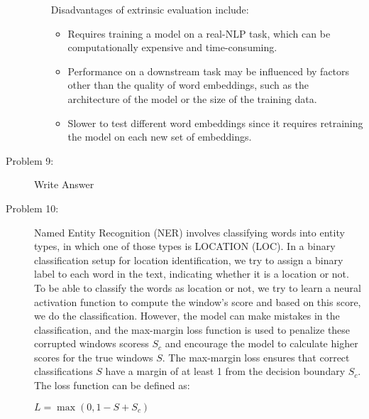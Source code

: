 \documentclass[12pt]{article}
\begin{document}
\begin{description}
\begin{enumerate}
  Disadvantages of extrinsic evaluation include:

  \begin{itemize}
    \item Requires training a model on a real-NLP task, which can be computationally expensive and time-consuming.
    \item Performance on a downstream task may be influenced by factors other than the quality of word embeddings, such as the architecture of the model or the size of the training data.
    \item Slower to test different word embeddings since it requires retraining the model on each new set of embeddings.
  \end{itemize}

  \end{enumerate}

  \pagebreak

  \item[Problem 9:] \hfill %
  
  Write Answer

  \pagebreak

  \item[Problem 10:] \hfill %
  
  Named Entity Recognition (NER) involves classifying words into entity types, in which one of those types is LOCATION (LOC). In a binary classification setup for 
  location identification, we try to assign a binary label to each word in the text, indicating whether it is a location or not. To be able to classify the words as location
  or not, we try to learn a neural activation function to compute the window's score and based on this score, we do the classification. However, the model can make mistakes
  in the classification, and the max-margin loss function is used to penalize these corrupted windows scoress $S_c$ and encourage the model to calculate higher scores for the 
  true windows $S$. The max-margin loss ensures that correct classifications $S$ have a margin of at least 1 from the decision boundary $S_c$. The loss function can be defined as:

  \begin{center}
    $\displaystyle{L = \max(0, 1 - S + S_c)}$
  \end{center}
  

\end{description}
\end{document}
